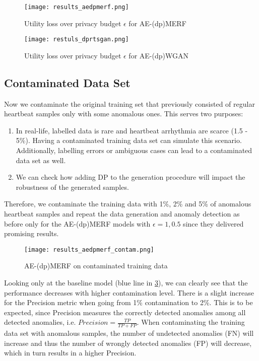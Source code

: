 \begin{figure}[H]
    \centering
    \texttt{[image: results\_aedpmerf.png]}
    \caption{Utility loss over privacy budget $\epsilon$ for AE-(dp)MERF}
    \label{fig:res_aedpmerf}
\end{figure}

\begin{figure}[H]
    \centering
    \texttt{[image: restuls\_dprtsgan.png]}
    \caption{Utility loss over privacy budget $\epsilon$ for AE-(dp)WGAN}
    \label{fig:res_aedpmerf}
\end{figure}

\subsection{Contaminated Data Set}
Now we contaminate the original training set that previously consisted of regular heartbeat samples only with some anomalous ones. This serves two purposes:
\begin{enumerate}
    \item In real-life, labelled data is rare and heartbeat arrhythmia are scarce (1.5 - 5\%). Having a contaminated training data set can simulate this scenario. Additionally, labelling errors or ambiguous cases can lead to a contaminated data set as well.
    \item We can check how adding DP to the generation procedure will impact the robustness of the generated samples. 
\end{enumerate}

Therefore, we contaminate the training data with 1\%, 2\% and 5\% of anomalous heartbeat samples and repeat the data generation and anomaly detection as before only for the AE-(dp)MERF models with $\epsilon=1, 0.5$ since they delivered promising results.

\begin{figure}[H]
    \centering
    \texttt{[image: results\_aedpmerf\_contam.png]}
    \caption{AE-(dp)MERF on contaminated training data}
    \label{fig:res_contam_aedpmerf}
\end{figure}

Looking only at the baseline model (blue line in \cref{fig:res_contam_aedpmerf}), we can clearly see that the performance decreases with higher contamination level. There is a slight increase for the Precision metric when going from 1\% contamination to 2\%. This is to be expected, since Precision measures the correctly detected anomalies among all detected anomalies, i.e. $Precision=\frac{TP}{TP+FP}$. When contaminating the training data set with anomalous samples, the number of undetected anomalies (FN) will increase and thus the number of wrongly detected anomalies (FP) will decrease, which in turn results in a higher Precision.

